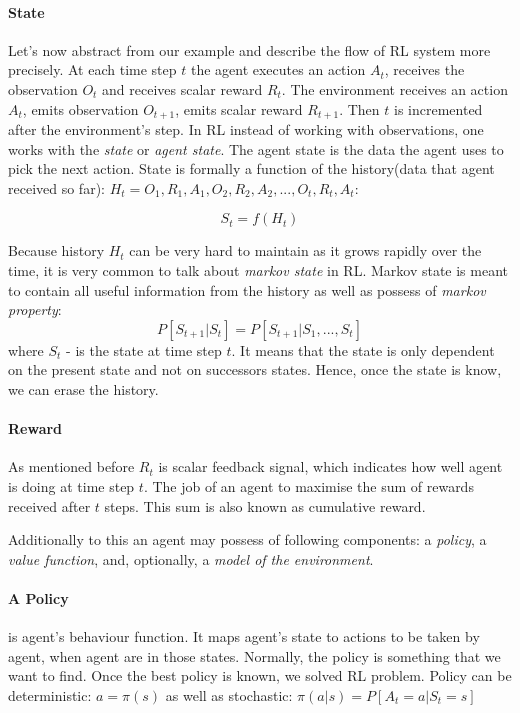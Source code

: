 \paragraph{State}
Let's now abstract from our example and describe the flow of RL system more precisely.
At each time step $t$ the agent executes an action $A_t$, receives the observation $O_t$
and receives scalar reward $R_t$. The environment receives an action $A_t$,
emits observation $O_{t+1}$, emits scalar reward $R_{t+1}$. Then $t$ is incremented
after the environment's step. In RL instead of working with observations, one works
with the \emph{state} or \emph{agent state}. The agent state is the data the agent uses
to pick the next action. State is formally a function of the
history(data that agent received so far):
$H_t = O_1, R_1, A_1, O_2, R_2, A_2, ..., O_t, R_t, A_t$:

\begin{equation} \label{eq:rl_state}
	S_t = f(H_t)
\end{equation}

Because history $H_t$ can be very hard to maintain as it grows rapidly over the time,
it is very common to talk about \emph{markov state} in RL. Markov state is meant
to contain all useful information from the history as well as possess of \emph{markov property}:
\begin{equation} \label{eq:markov_property}
	P[S_{t+1} | S_t] = P[S_{t+1} | S_1, ..., S_t]
\end{equation}
where $S_t$ - is the state at time step $t$.
It means that the state is only dependent on the present state and not on
successors states. Hence, once the state is know, we can erase the history.

\paragraph{Reward} As mentioned before $R_t$ is scalar feedback signal, which
indicates how well agent is doing at time step $t$. The job of an agent to
maximise the sum of rewards received after $t$ steps. This sum is also known as
cumulative reward.

Additionally to this an agent may possess of following components:
a \emph{policy},
a \emph{value function}, and,
optionally, a \emph{model of the environment}.

\paragraph{A Policy} is agent's behaviour function. It maps agent's state
to actions to be taken by agent, when agent are in those states. Normally, the policy is
something that we want to find. Once the best policy is known, we solved RL problem.
Policy can be deterministic: $a = \pi (s)$
as well as stochastic: $\pi(a|s) = P[A_t = a|S_t = s]$

